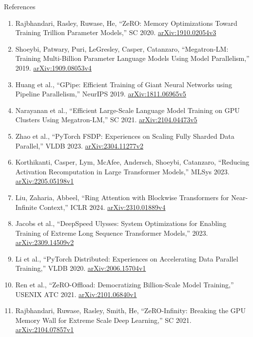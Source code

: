 \begin{frame}[allowframebreaks]{References}
  \footnotesize
  \begin{enumerate}
    \item Rajbhandari, Rasley, Ruwase, He, ``ZeRO: Memory Optimizations Toward Training Trillion Parameter Models,'' SC 2020. \href{https://arxiv.org/abs/1910.02054v3}{arXiv:1910.02054v3}
    \item Shoeybi, Patwary, Puri, LeGresley, Casper, Catanzaro, ``Megatron-LM: Training Multi-Billion Parameter Language Models Using Model Parallelism,'' 2019. \href{https://arxiv.org/abs/1909.08053v4}{arXiv:1909.08053v4}
    \item Huang et al., ``GPipe: Efficient Training of Giant Neural Networks using Pipeline Parallelism,'' NeurIPS 2019. \href{https://arxiv.org/abs/1811.06965v5}{arXiv:1811.06965v5}
    \item Narayanan et al., ``Efficient Large-Scale Language Model Training on GPU Clusters Using Megatron-LM,'' SC 2021. \href{https://arxiv.org/abs/2104.04473v5}{arXiv:2104.04473v5}
    \item Zhao et al., ``PyTorch FSDP: Experiences on Scaling Fully Sharded Data Parallel,'' VLDB 2023. \href{https://arxiv.org/abs/2304.11277v2}{arXiv:2304.11277v2}
    \item Korthikanti, Casper, Lym, McAfee, Andersch, Shoeybi, Catanzaro, ``Reducing Activation Recomputation in Large Transformer Models,'' MLSys 2023. \href{https://arxiv.org/abs/2205.05198v1}{arXiv:2205.05198v1}
    \item Liu, Zaharia, Abbeel, ``Ring Attention with Blockwise Transformers for Near-Infinite Context,'' ICLR 2024. \href{https://arxiv.org/abs/2310.01889v4}{arXiv:2310.01889v4}
    \item Jacobs et al., ``DeepSpeed Ulysses: System Optimizations for Enabling Training of Extreme Long Sequence Transformer Models,'' 2023. \href{https://arxiv.org/abs/2309.14509v2}{arXiv:2309.14509v2}
    \item Li et al., ``PyTorch Distributed: Experiences on Accelerating Data Parallel Training,'' VLDB 2020. \href{https://arxiv.org/abs/2006.15704v1}{arXiv:2006.15704v1}
    \item Ren et al., ``ZeRO-Offload: Democratizing Billion-Scale Model Training,'' USENIX ATC 2021. \href{https://arxiv.org/abs/2101.06840v1}{arXiv:2101.06840v1}
    \item Rajbhandari, Ruwase, Rasley, Smith, He, ``ZeRO-Infinity: Breaking the GPU Memory Wall for Extreme Scale Deep Learning,'' SC 2021. \href{https://arxiv.org/abs/2104.07857v1}{arXiv:2104.07857v1}

\end{enumerate}
\end{frame}
